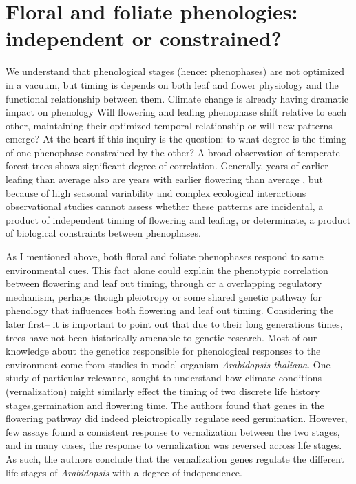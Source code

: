 \documentclass{article}\usepackage[]{graphicx}\usepackage[]{color}
\begin{document}
\section{Floral and foliate phenologies: independent or constrained?}
\par We understand that phenological stages (hence: phenophases) are not optimized in a vacuum, but timing is depends on both leaf and flower physiology and the functional relationship between them. Climate change is already having dramatic impact on phenology \citep{Wolkovich2012} Will flowering and leafing phenophase shift relative to each other, maintaining their optimized temporal relationship or will new patterns emerge?
At the heart if this inquiry is the question: to what degree is the timing of one phenophase constrained by the other? A broad observation of temperate forest trees shows significant degree of correlation. Generally, years of earlier leafing than average also are years with earlier flowering than average \citep{Lechowicz1995}, but because of high seasonal variability and complex ecological interactions observational studies cannot assess whether these patterns are incidental, a product of independent timing of flowering and leafing, or determinate, a product of biological constraints between phenophases. 
\par As I mentioned above, both floral and foliate phenophases respond to same environmental cues. This fact alone could explain the phenotypic correlation between flowering and leaf out timing, through or a overlapping regulatory mechanism, perhaps though pleiotropy or some shared genetic pathway for phenology that influences both flowering and leaf out timing. Considering the later first-- it is important to point out that due to their long generations times, trees have not been historically amenable to genetic research. Most of our knowledge about the genetics responsible for phenological responses to the environment come from studies in model organism \textit{Arabidopsis thaliana}. One study of particular relevance, sought to understand how climate conditions (vernalization) might similarly effect the timing of two discrete life history stages,germination and flowering time\citep{Auge2017}. The authors found that genes in the flowering pathway did indeed pleiotropically regulate seed germination. However, few assays found a consistent response to vernalization between the two stages, and in many cases, the response to vernalization was reversed across life stages. As such, the authors conclude that the vernalization genes regulate the different life stages of \textit{Arabidopsis} with a degree of independence. 
\end{document}
